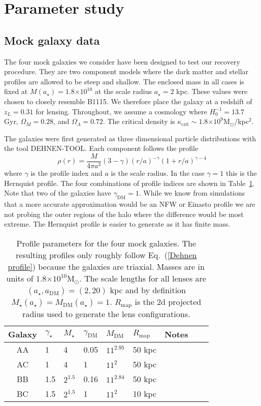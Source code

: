 \documentclass[onecolumn,galley]{mn2e}
\newcommand{\Rmap}{\ensuremath{R_\mathrm{map}}}
\newcommand{\Msun}{\ensuremath{\mathrm{M}_\odot}}
\newcommand{\tabref}[1] {Table~\ref{#1}}
\newcommand{\eqnref}[1] {Eq.~(\ref{#1})}
\newcommand{\e}[1]{\ensuremath{\times 10^{#1}}}
\begin{document}
\section{Parameter study}

\subsection{Mock galaxy data}

The four mock galaxies we consider have been designed to test our recovery
procedure. They are two component models where the dark matter and stellar
profiles are allowed to be steep and shallow.  The enclosed mass in all cases
is fixed at $M(a_\star)= 1.8\e{10}$ at the scale radius $a_\star=2$ kpc. These
values were chosen to closely resemble B1115. We therefore place the galaxy at
a redshift of $z_L = 0.31$ for lensing.  Throughout, we assume a cosmology
where $H_0^{-1}=13.7$ Gyr, $\Omega_M=0.28$, and $\Omega_\Lambda=0.72$. The
critical density is $\kappa_\mathrm{crit}\sim 1.8\e{9}$\Msun/kpc$^2$.

The galaxies were
first generated as three dimensional particle distributions with the
tool DEHNEN-TOOL. Each component follows the profile
\begin{equation}
\rho(r) = \frac{M}{4\pi a^3}(3-\gamma){(r/a)^{-\gamma}(1 + r/a)^{\gamma-4}}
\label{Dehnen profile}
\end{equation}
where $\gamma$ is the profile index and $a$ is the scale radius.  In the
case $\gamma=1$ this is the Hernquist profile.  The four combinations of
profile indices are shown in \tabref{mock galaxy params}.  Note that two of
the galaxies have $\gamma_\mathrm{DM}=1$. While we know from simulations that a
more accurate approximation would be an NFW or Einasto profile we are not
probing the outer regions of the halo where the difference would be most
extreme.  The Hernquist profile is easier to generate as it has finite mass.

\begin{table}
\begin{tabular}{cllllllll}
Galaxy & $\gamma_\star$ & $M_\star$ & $\gamma_\mathrm{DM}$ & $M_\mathrm{DM}$ & $\Rmap$ & Notes\\
\hline
AA & 1 & 4 & 0.05 & $11^{2.95}$ & 50 kpc & \\
AC & 1 & 4 & 1 & $11^2$ & 50 kpc & \\
BB & 1.5 & $2^{1.5}$ & 0.16 & $11^{2.84}$ & 50 kpc & \\
BC & 1.5 & $2^{1.5}$ & 1 & $11^2$ & 10 kpc & 
\end{tabular}
\caption{Profile parameters for the four mock galaxies. The resulting profiles only roughly follow
\eqnref{Dehnen profile} because the galaxies are triaxial. Masses are in units of $1.8\e{10}\Msun$. The scale lengths for
all lenses are $(a_\star,a_\mathrm{DM})=(2,20)$ kpc and by definition
$M_\star(a_\star) = M_\mathrm{DM}(a_\star) = 1$. $\Rmap$ is the 2d projected radius used to generate the lens configurations.}
\label{mock galaxy params}
\end{table}
\end{document}
